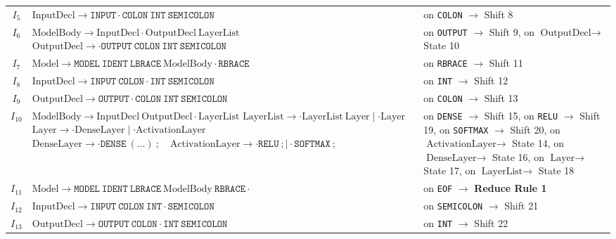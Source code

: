 \documentclass[11pt,a4paper]{article}
\begin{document}
\begin{table}[htbp]
\begin{tabular}{cp{6.5cm}p{5.5cm}}
$I_5$  & $\text{InputDecl} \rightarrow \texttt{INPUT} \cdot \texttt{COLON} \ \texttt{INT} \ \texttt{SEMICOLON}$ & on \texttt{COLON} $\rightarrow$ Shift 8 \\
$I_6$  & $\text{ModelBody} \rightarrow \text{InputDecl} \cdot \text{OutputDecl} \ \text{LayerList}$ \newline $\text{OutputDecl} \rightarrow \cdot \texttt{OUTPUT} \ \texttt{COLON} \ \texttt{INT} \ \texttt{SEMICOLON}$ & on \texttt{OUTPUT} $\rightarrow$ Shift 9, on $\text{OutputDecl} \rightarrow$ State 10 \\
$I_7$  & $\text{Model} \rightarrow \texttt{MODEL} \ \texttt{IDENT} \ \texttt{LBRACE} \ \text{ModelBody} \cdot \texttt{RBRACE}$ & on \texttt{RBRACE} $\rightarrow$ Shift 11 \\
$I_8$  & $\text{InputDecl} \rightarrow \texttt{INPUT} \ \texttt{COLON} \cdot \texttt{INT} \ \texttt{SEMICOLON}$ & on \texttt{INT} $\rightarrow$ Shift 12 \\
$I_9$  & $\text{OutputDecl} \rightarrow \texttt{OUTPUT} \cdot \texttt{COLON} \ \texttt{INT} \ \texttt{SEMICOLON}$ & on \texttt{COLON} $\rightarrow$ Shift 13 \\
$I_{10}$ & $\text{ModelBody} \rightarrow \text{InputDecl} \ \text{OutputDecl} \cdot \text{LayerList}$ \newline $\text{LayerList} \rightarrow \cdot \text{LayerList} \ \text{Layer} \mid \cdot \text{Layer}$ \newline $\text{Layer} \rightarrow \cdot \text{DenseLayer} \mid \cdot \text{ActivationLayer}$ \newline $\text{DenseLayer} \rightarrow \cdot \texttt{DENSE} \ (\dots) \ ; \quad \text{ActivationLayer} \rightarrow \cdot \texttt{RELU} \ ; \mid \cdot \texttt{SOFTMAX} \ ;$ & on \texttt{DENSE} $\rightarrow$ Shift 15, on \texttt{RELU} $\rightarrow$ Shift 19, on \texttt{SOFTMAX} $\rightarrow$ Shift 20, on $\text{ActivationLayer} \rightarrow$ State 14, on $\text{DenseLayer} \rightarrow$ State 16, on $\text{Layer} \rightarrow$ State 17, on $\text{LayerList} \rightarrow$ State 18 \\
$I_{11}$ & $\text{Model} \rightarrow \texttt{MODEL} \ \texttt{IDENT} \ \texttt{LBRACE} \ \text{ModelBody} \ \texttt{RBRACE} \cdot$ & on \texttt{EOF} $\rightarrow$ \textbf{Reduce Rule 1} \\
$I_{12}$ & $\text{InputDecl} \rightarrow \texttt{INPUT} \ \texttt{COLON} \ \texttt{INT} \cdot \texttt{SEMICOLON}$ & on \texttt{SEMICOLON} $\rightarrow$ Shift 21 \\
$I_{13}$ & $\text{OutputDecl} \rightarrow \texttt{OUTPUT} \ \texttt{COLON} \cdot \texttt{INT} \ \texttt{SEMICOLON}$ & on \texttt{INT} $\rightarrow$ Shift 22 \\

\end{tabular}
\end{table}
\end{document}
